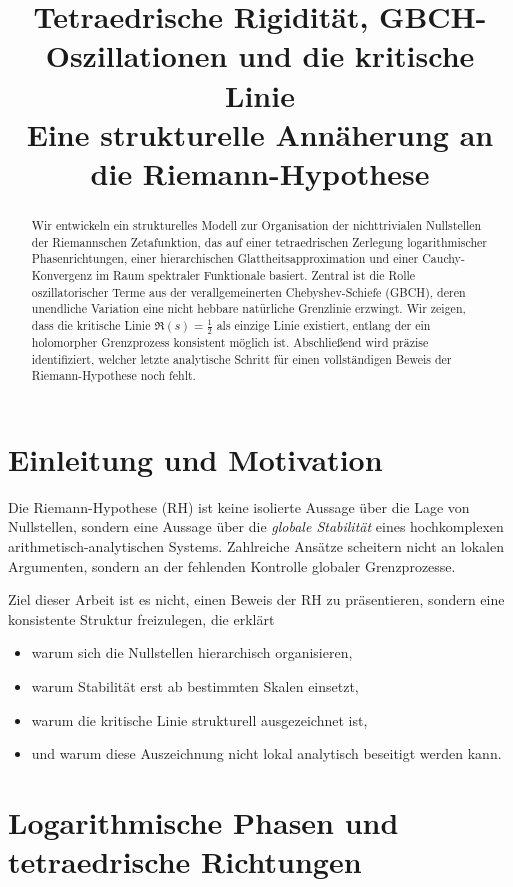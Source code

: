 \documentclass[11pt,a4paper]{article}
\title{\textbf{Tetraedrische Rigidität, GBCH-Oszillationen und die kritische Linie}\\
\large Eine strukturelle Annäherung an die Riemann-Hypothese}
\author{ }
\date{}
\begin{document}
\maketitle

\begin{abstract}
Wir entwickeln ein strukturelles Modell zur Organisation der nichttrivialen Nullstellen der Riemannschen Zetafunktion, das auf einer tetraedrischen Zerlegung logarithmischer Phasenrichtungen, einer hierarchischen Glattheitsapproximation und einer Cauchy-Konvergenz im Raum spektraler Funktionale basiert. 
Zentral ist die Rolle oszillatorischer Terme aus der verallgemeinerten Chebyshev-Schiefe (GBCH), deren unendliche Variation eine nicht hebbare natürliche Grenzlinie erzwingt.
Wir zeigen, dass die kritische Linie $\Re(s)=\tfrac12$ als einzige Linie existiert, entlang der ein holomorpher Grenzprozess konsistent möglich ist.
Abschließend wird präzise identifiziert, welcher letzte analytische Schritt für einen vollständigen Beweis der Riemann-Hypothese noch fehlt.
\end{abstract}

\tableofcontents

\section{Einleitung und Motivation}

Die Riemann-Hypothese (RH) ist keine isolierte Aussage über die Lage von Nullstellen, sondern eine Aussage über die \emph{globale Stabilität} eines hochkomplexen arithmetisch-analytischen Systems.
Zahlreiche Ansätze scheitern nicht an lokalen Argumenten, sondern an der fehlenden Kontrolle globaler Grenzprozesse.

Ziel dieser Arbeit ist es nicht, einen Beweis der RH zu präsentieren, sondern eine konsistente Struktur freizulegen, die erklärt
\begin{itemize}
\item warum sich die Nullstellen hierarchisch organisieren,
\item warum Stabilität erst ab bestimmten Skalen einsetzt,
\item warum die kritische Linie strukturell ausgezeichnet ist,
\item und warum diese Auszeichnung nicht lokal analytisch beseitigt werden kann.
\end{itemize}

\section{Logarithmische Phasen und tetraedrische Richtungen}
\end{document}
